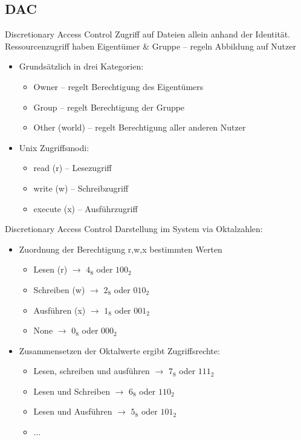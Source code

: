 \documentclass[xcolor=dvipsnames,aspectratio=169]{beamer}
\begin{document}
\subsection{DAC}
\begin{frame}{Discretionary Access Control}
Zugriff auf Dateien allein anhand der Identität.\\
Ressourcenzugriff haben Eigentümer \& Gruppe -- regeln Abbildung auf Nutzer
\begin{itemize}
	\item Grundsätzlich in drei Kategorien:
	\begin{itemize}
		\item Owner -- regelt Berechtigung des Eigentümers
		\item Group -- regelt Berechtigung der Gruppe
		\item Other (world) -- regelt Berechtigung aller anderen Nutzer 
	\end{itemize}
	\item Unix Zugriffsmodi:
	\begin{itemize}
		\item read (r) -- Lesezugriff
		\item write (w) -- Schreibzugriff
		\item execute (x) -- Ausführzugriff
	\end{itemize}
\end{itemize}
\end{frame}

\begin{frame}{Discretionary Access Control}
Darstellung im System via Oktalzahlen:
\begin{itemize}
	\item Zuordnung der Berechtigung r,w,x bestimmten Werten
	\begin{itemize}
		\item Lesen (r) $\rightarrow$ $4_8$ oder $100_2$
		\item Schreiben (w) $\rightarrow$ $2_8$ oder $010_2$
		\item Ausführen (x) $\rightarrow$ $1_8$ oder $001_2$
		\item None $\rightarrow$ $0_8$ oder $000_2$
	\end{itemize}
	\item Zusammensetzen der Oktalwerte ergibt Zugriffsrechte:
	\begin{itemize}
		\item Lesen, schreiben und ausführen $\rightarrow$ $7_8$ oder $111_2$
		\item Lesen und Schreiben $\rightarrow$ $6_8$ oder $110_2$
		\item Lesen und Ausführen $\rightarrow$ $5_8$ oder $101_2$
		\item ...
	\end{itemize}
\end{itemize}
\end{frame}
\end{document}
